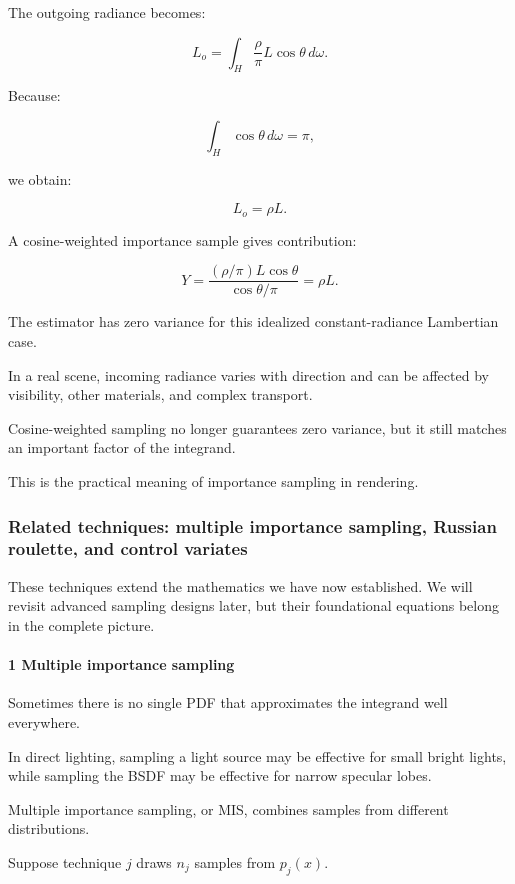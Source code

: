 The outgoing radiance becomes:

\[
 L_o= \int_H \frac\rho\pi L\cos\theta\,d\omega.
\]

Because:

\[
 \int_H\cos\theta\,d\omega=\pi,
\]

we obtain:

\[
 \boxed{L_o=\rho L}.
\]

A cosine-weighted importance sample gives contribution:

\[
 Y= \frac{ (\rho/\pi)L\cos\theta }{ \cos\theta/\pi } =\rho L.
\]

The estimator has zero variance for this idealized constant-radiance Lambertian case.

In a real scene, incoming radiance varies with direction and can be affected by visibility, other materials, and complex transport.

Cosine-weighted sampling no longer guarantees zero variance, but it still matches an important factor of the integrand.

This is the practical meaning of importance sampling in rendering.

\subsubsection{Related techniques: multiple importance sampling, Russian roulette, and control variates}\label{related-techniques-multiple-importance-sampling-russian-roulette-and-control-variates}

These techniques extend the mathematics we have now established. We will revisit advanced sampling designs later, but their foundational equations belong in the complete picture.

\paragraph{1 Multiple importance sampling}\label{multiple-importance-sampling}

Sometimes there is no single PDF that approximates the integrand well everywhere.

In direct lighting, sampling a light source may be effective for small bright lights, while sampling the BSDF may be effective for narrow specular lobes.

Multiple importance sampling, or MIS, combines samples from different distributions.

Suppose technique \(j\) draws \(n_j\) samples from \(p_j(x)\).

